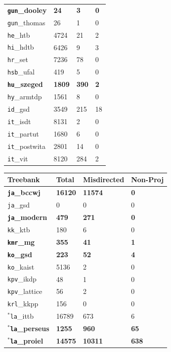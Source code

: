 \begin{table}[H]
{\begin{tabular}{|l|l|l|l|}
\textbf{\texttt{gun}\_dooley} & \textbf{24} & \textbf{3} & \textbf{0}\\
\texttt{gun}\_thomas & 26 & 1 & 0\\
\texttt{he}\_htb & 4724 & 21 & 2\\
\texttt{hi}\_hdtb & 6426 & 9 & 3\\
\texttt{hr}\_set & 7236 & 78 & 0\\
\texttt{hsb}\_ufal & 419 & 5 & 0\\
\textbf{\texttt{hu}\_szeged} & \textbf{1809} & \textbf{390} & \textbf{2}\\
\texttt{hy}\_armtdp & 1561 & 8 & 0\\
\texttt{id}\_gsd & 3549 & 215 & 18\\
\texttt{it}\_isdt & 8131 & 2 & 0\\
\texttt{it}\_partut & 1680 & 6 & 0\\
\texttt{it}\_postwita & 2801 & 14 & 0\\
\texttt{it}\_vit & 8120 & 284 & 2\\
\hline
\end{tabular}
\hspace{4mm}
\begin{tabular}{|l|l|l|l|}
\hline
\textbf{Treebank} & \textbf{Total} & \textbf{Misdirected} & \textbf{Non-Proj}\\
\hline
\textbf{\texttt{ja}\_bccwj} & \textbf{16120} & \textbf{11574} & \textbf{0}\\
\texttt{ja}\_gsd & 0 & 0 & 0\\
\textbf{\texttt{ja}\_modern} & \textbf{479} & \textbf{271} & \textbf{0}\\
\texttt{kk}\_ktb & 180 & 6 & 0\\
\textbf{\texttt{kmr}\_mg} & \textbf{355} & \textbf{41} & \textbf{1}\\
\textbf{\texttt{ko}\_gsd} & \textbf{223} & \textbf{52} & \textbf{4}\\
\texttt{ko}\_kaist & 5136 & 2 & 0\\
\texttt{kpv}\_ikdp & 48 & 1 & 0\\
\texttt{kpv}\_lattice & 56 & 2 & 0\\
\texttt{krl}\_kkpp & 156 & 0 & 0\\
\(^{*}\)\texttt{la}\_ittb & 16789 & 673 & 6\\
\(^{*}\)\textbf{\texttt{la}\_perseus} & \textbf{1255} & \textbf{960} & \textbf{65}\\
\(^{*}\)\textbf{\texttt{la}\_proiel} & \textbf{14575} & \textbf{10311} & \textbf{638}\\

\end{tabular}}
\end{table}
